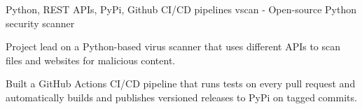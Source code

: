\begin{cventries}
	
	\cventry
	{Python, REST APIs, PyPi, Github CI/CD pipelines} %
	{vscan - Open-source Python security scanner} %
	{}
	{}
	{
		\begin{cvitems}
			\item Project lead on a Python-based virus scanner that uses different APIs to scan files and websites for malicious content.
			\item Built a GitHub Actions CI/CD pipeline that runs tests on every pull request and automatically builds and publishes versioned releases to PyPi on tagged commits.
		\end{cvitems}
	}
	
\end{cventries}
